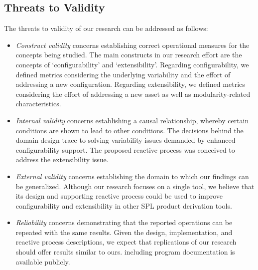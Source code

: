 
\subsection{Threats to Validity} 
\label{sec:threats}

The threats to validity of our research can be addressed as follows:

\begin{itemize}

\item \emph{Construct validity} concerns establishing correct operational measures for the concepts being studied. The main constructs in our research effort are the concepts of `configurability' and `extensibility'. Regarding configurability, we defined metrics considering the underlying variability and the effort of addressing a new configuration. Regarding extensibility, we defined metrics considering the effort of addressing a new asset as well as modularity-related characteristics.

\item \emph{Internal validity} concerns establishing a causal relationship, whereby certain conditions are shown to lead to other conditions. The decisions behind the domain design trace to solving variability issues demanded by enhanced configurability support. The proposed reactive process was conceived to address the extensibility issue.

\item \emph{External validity} concerns establishing the domain to which our findings can be generalized. Although our research focuses on a single tool, we believe that its design and supporting reactive process could be used to improve configurability and extensibility in other SPL product derivation tools.

\item \emph{Reliability} concerns demonstrating that the reported operations can be repeated with the same results. Given the design, implementation, and reactive process descriptions, we expect that replications of our research should offer results similar to ours. \hpl{} including program documentation is available publicly.

\end{itemize}

